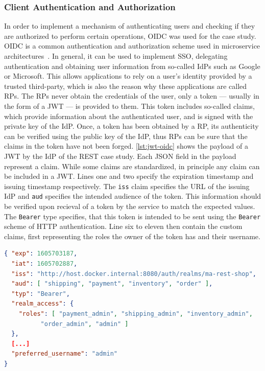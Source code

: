 \subsubsection{Client Authentication and Authorization}\label{sec:rest-auth}

In order to implement a mechanism of authenticating users and checking if they are authorized to perform certain operations, \ac{OIDC} was used for the case study.
\ac{OIDC} is a common authentication and authorization scheme used in microservice architectures~\cite{Nehme2019, Hammann2020}.
In general, it can be used to implement \ac{SSO}, delegating authentication and obtaining user information from so-called \acp{IdP} such as Google or Microsoft.
This allows applications to rely on a user's identity provided by a trusted third-party, which is also the reason why these applications are called \acp{RP}.
The \acp{RP} never obtain the credentials of the user, only a token --- usually in the form of a \ac{JWT} --- is provided to them.
This token includes so-called claims, which provide information about the authenticated user, and is signed with the private key of the \ac{IdP}.
Once, a token has been obtained by a \ac{RP}, its authenticity can be verified using the public key of the \ac{IdP}, thus \acp{RP} can be sure that the claims in the token have not been forged.
\autoref{lst:jwt-oidc} shows the payload of a \ac{JWT} by the \ac{IdP} of the \ac{REST} case study.
Each \ac{JSON} field in the payload represent a claim.
While some claims are standardized, in principle any claim can be included in a \ac{JWT}.
Lines one and two specify the expiration timestamp and issuing timestamp respectively.
The \texttt{iss} claim specifies the \ac{URL} of the issuing \ac{IdP} and \texttt{aud} specifies the intended audience of the token.
This information should be verified upon recieval of a token by the service to match the expected values.
The \texttt{Bearer} type specifies, that this token is intended to be sent using the \texttt{Bearer} scheme of \ac{HTTP} authentication.
Line six to eleven then contain the custom claims, first representing the roles the owner of the token has and their username.

\begin{lstlisting}[caption={\acs{JWT} Issued by an \acs{IdP}}, language=json, label={lst:jwt-oidc}]
{ "exp": 1605703187,
  "iat": 1605702887,
  "iss": "http://host.docker.internal:8080/auth/realms/ma-rest-shop",
  "aud": [ "shipping", "payment", "inventory", "order" ],
  "typ": "Bearer",
  "realm_access": {
    "roles": [ "payment_admin", "shipping_admin", "inventory_admin",
          "order_admin", "admin" ]
  },
  [...]
  "preferred_username": "admin"
}
\end{lstlisting}

